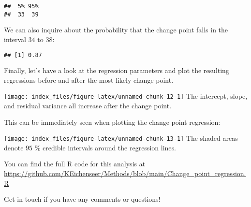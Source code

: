 \documentclass[]{article}
\newenvironment{Shaded}{\begin{snugshade}}{\end{snugshade}}
\newcommand{\KeywordTok}[1]{\textcolor[rgb]{0.13,0.29,0.53}{\textbf{#1}}}
\newcommand{\DecValTok}[1]{\textcolor[rgb]{0.00,0.00,0.81}{#1}}
\newcommand{\StringTok}[1]{\textcolor[rgb]{0.31,0.60,0.02}{#1}}
\newcommand{\OperatorTok}[1]{\textcolor[rgb]{0.81,0.36,0.00}{\textbf{#1}}}
\newcommand{\NormalTok}[1]{#1}
\begin{document}
\begin{verbatim}
##  5% 95% 
##  33  39
\end{verbatim}

We can also inquire about the probability that the change point falls in
the interval \(34\) to \(38\):

\begin{Shaded}
\end{Shaded}

\begin{verbatim}
## [1] 0.87
\end{verbatim}

Finally, let's have a look at the regression parameters and plot the
resulting regressions before and after the most likely change point.

\texttt{[image: index\_files/figure-latex/unnamed-chunk-12-1]}
The intercept, slope, and residual variance all increase after the
change point.

This can be immediately seen when plotting the change point regression:

\texttt{[image: index\_files/figure-latex/unnamed-chunk-13-1]}
The shaded areas denote \(95\) \% credible intervals around the
regression lines.

You can find the full R code for this analysis at
\url{https://github.com/KEichenseer/Methods/blob/main/Change_point_regression.R}

Get in touch if you have any comments or questions!
\end{document}
